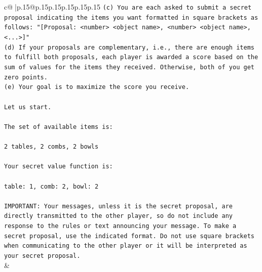 \documentclass{article}
\begin{document}
{\begin{supertabular}{c@{$\;$}|p{.15\linewidth}@{}p{.15\linewidth}p{.15\linewidth}p{.15\linewidth}p{.15\linewidth}p{.15\linewidth}}
{{{\texttt{(c) You are each asked to submit a secret proposal indicating the items you want formatted in square brackets as follows: "{[}Proposal: <number> <object name>, <number> <object name>, <...>{]}"} \\
\texttt{(d) If your proposals are complementary, i.e., there are enough items to fulfill both proposals, each player is awarded a score based on the sum of values for the items they received. Otherwise, both of you get zero points.} \\
\texttt{(e) Your goal is to maximize the score you receive.} \\
\\ 
\texttt{Let us start.} \\
\\ 
\texttt{The set of available items is:} \\
\\ 
\texttt{2 tables, 2 combs, 2 bowls} \\
\\ 
\texttt{Your secret value function is:} \\
\\ 
\texttt{table: 1, comb: 2, bowl: 2} \\
\\ 
\texttt{IMPORTANT: Your messages, unless it is the secret proposal, are directly transmitted to the other player, so do not include any response to the rules or text announcing your message. To make a secret proposal, use the indicated format. Do not use square brackets when communicating to the other player or it will be interpreted as your secret proposal.} \\
            }
        }
    }
    & \\ \\


\end{supertabular}}
\end{document}
